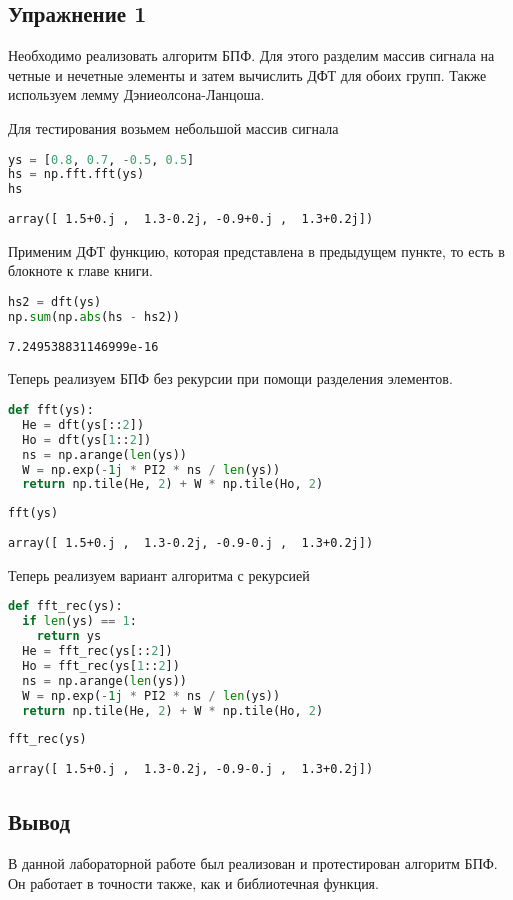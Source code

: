 \subsection{Упражнение 1}

Необходимо реализовать алгоритм БПФ. Для этого разделим массив сигнала на четные и нечетные элементы и затем вычислить ДФТ для обоих групп.
Также используем лемму Дэниеолсона-Ланцоша.

Для тестирования возьмем небольшой массив сигнала

\begin{lstlisting}[language=Python]
ys = [0.8, 0.7, -0.5, 0.5]
hs = np.fft.fft(ys)
hs
\end{lstlisting}
\begin{lstlisting}
array([ 1.5+0.j ,  1.3-0.2j, -0.9+0.j ,  1.3+0.2j])
\end{lstlisting}

Применим ДФТ функцию, которая представлена в предыдущем пункте, то есть в блокноте к главе книги.

\begin{lstlisting}[language=Python]
hs2 = dft(ys)
np.sum(np.abs(hs - hs2))
\end{lstlisting}
\begin{lstlisting}
7.249538831146999e-16
\end{lstlisting}

Теперь реализуем БПФ без рекурсии при помощи разделения элементов.

\begin{lstlisting}[language=Python]
def fft(ys):
  He = dft(ys[::2])
  Ho = dft(ys[1::2])
  ns = np.arange(len(ys))
  W = np.exp(-1j * PI2 * ns / len(ys))
  return np.tile(He, 2) + W * np.tile(Ho, 2)
\end{lstlisting}

\begin{lstlisting}[language=Python]
fft(ys)
\end{lstlisting}
\begin{lstlisting}
array([ 1.5+0.j ,  1.3-0.2j, -0.9-0.j ,  1.3+0.2j])
\end{lstlisting}

Теперь реализуем вариант алгоритма с рекурсией

\begin{lstlisting}[language=Python]
def fft_rec(ys):
  if len(ys) == 1:
    return ys
  He = fft_rec(ys[::2])
  Ho = fft_rec(ys[1::2])
  ns = np.arange(len(ys))
  W = np.exp(-1j * PI2 * ns / len(ys))
  return np.tile(He, 2) + W * np.tile(Ho, 2)
\end{lstlisting}

\begin{lstlisting}[language=Python]
fft_rec(ys)
\end{lstlisting}
\begin{lstlisting}
array([ 1.5+0.j ,  1.3-0.2j, -0.9-0.j ,  1.3+0.2j])
\end{lstlisting}

\subsection{Вывод}

В данной лабораторной работе был реализован и протестирован алгоритм БПФ. Он работает в точности также, как и библиотечная функция. 
